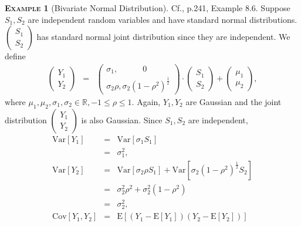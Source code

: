 \documentclass[a4paper, twoside, 11pt]{article}
\theoremstyle{definition}
\newtheorem{example}[definition]{\scshape Example}
\begin{document}
\begin{example}[Bivariate Normal Distribution]
  Cf.\cite{severini}, p.241, Example 8.6. Suppose $S_1, S_2$ are independent random variables and have standard normal distributions. $\left(
    \begin{array}{c}
      S_1 \\
      S_2
    \end{array}
  \right)$  has standard normal joint distribution since they are independent. We define
  \begin{eqnarray}
	\left(
    \begin{array}{c}
      Y_1 \\
      Y_2
    \end{array}
	\right)
	&=& 
	\left(
    \begin{array}{l}
	  \sigma_1,\hspace{3em} 0 \\
	  \sigma_2 \rho, \sigma_2(1-\rho^2)^{\frac{1}{2}}
    \end{array}
  \right) \cdot
	\left(
    \begin{array}{c}
      S_1 \\
      S_2
    \end{array}
  \right)  +
  \left(
    \begin{array}{c}
      \mu_1 \\
      \mu_2
    \end{array}
  \right)
  \label{sec:bi},
  \end{eqnarray}
  where $\mu_1, \mu_2, \sigma_1, \sigma_2 \in \mathbb{R}, -1 \le \rho \le 1$. Again, $Y_1, Y_2$ are Gaussian and the joint distribution  $\left(
    \begin{array}{c}
      Y_1 \\
      Y_2
    \end{array}
	\right)$ is also Gaussian.  Since $S_1, S_2$ are independent,
	\begin{eqnarray*}
	  \mathrm{Var}[Y_1] &=& \mathrm{Var}[\sigma_1 S_1]\\
						 &=& \sigma_1^2 ,\\
						 \mathrm{Var}[Y_2] &=& \mathrm{Var}[\sigma_2\rho S_1] + \mathrm{Var}[\sigma_2 (1-\rho^2)^{\frac{1}{2}} S_2]\\
						 &=& \sigma_2^2 \rho^2 + \sigma_2^2(1 - \rho^2)\\
						 &=& \sigma_2^2,\\
						 \mathrm{Cov}[Y_1, Y_2] &=& \mathrm{E}[(Y_1 - \mathrm{E}[Y_1])(Y_2 - \mathrm{E}[Y_2])]\\

\end{eqnarray*}
\end{example}
\end{document}
